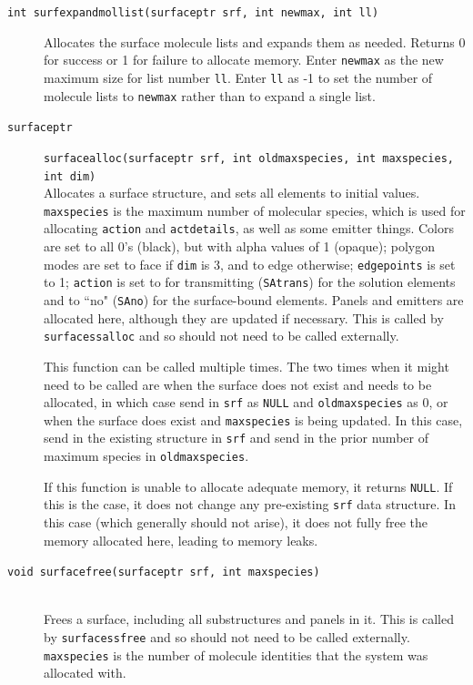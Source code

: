 \documentclass {scrbook}
\newcommand {\ttt} {\texttt}
\begin{document}
\begin{description}
\item[\ttt{int surfexpandmollist(surfaceptr srf, int newmax, int ll)}]
\hfill
Allocates the surface molecule lists and expands them as needed. Returns 0 for success or 1 for failure to allocate memory. Enter \ttt{newmax} as the new maximum size for list number \ttt{ll}. Enter \ttt{ll} as -1 to set the number of molecule lists to \ttt{newmax} rather than to expand a single list.

\item[\ttt{surfaceptr}]
\ttt{surfacealloc(surfaceptr srf, int oldmaxspecies, int maxspecies, int dim)}
\hfill \\
Allocates a surface structure, and sets all elements to initial values. \ttt{maxspecies} is the maximum number of molecular species, which is used for allocating \ttt{action} and \ttt{actdetails}, as well as some emitter things. Colors are set to all 0's (black), but with alpha values of 1 (opaque); polygon modes are set to face if \ttt{dim} is 3, and to edge otherwise; \ttt{edgepoints} is set to 1; \ttt{action} is set to for transmitting (\ttt{SAtrans}) for the solution elements and to ``no" (\ttt{SAno}) for the surface-bound elements. Panels and emitters are allocated here, although they are updated if necessary. This is called by \ttt{surfacessalloc} and so should not need to be called externally.

This function can be called multiple times. The two times when it might need to be called are when the surface does not exist and needs to be allocated, in which case send in \ttt{srf} as \ttt{NULL} and \ttt{oldmaxspecies} as 0, or when the surface does exist and \ttt{maxspecies} is being updated. In this case, send in the existing structure in \ttt{srf} and send in the prior number of maximum species in \ttt{oldmaxspecies}.

If this function is unable to allocate adequate memory, it returns \ttt{NULL}. If this is the case, it does not change any pre-existing \ttt{srf} data structure. In this case (which generally should not arise), it does not fully free the memory allocated here, leading to memory leaks.

\item[\ttt{void surfacefree(surfaceptr srf, int maxspecies)}]
\hfill \\
Frees a surface, including all substructures and panels in it. This is called by \ttt{surfacessfree} and so should not need to be called externally. \ttt{maxspecies} is the number of molecule identities that the system was allocated with.


\end{description}
\end{document}
